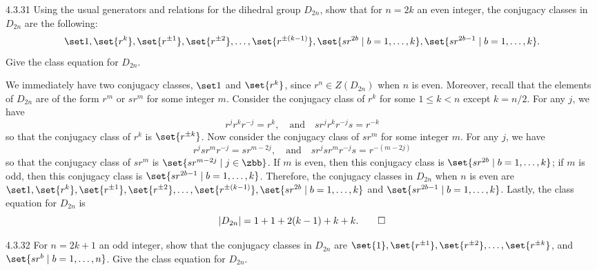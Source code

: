\begin{exercise}{4.3.31}
	Using the usual generators and relations for the dihedral group $D_{2n}$, show that for $n = 2k$ an even integer, the conjugacy classes in $D_{2n}$ are the following:
	\[
		\set 1, \set{r^k}, \set{r^{\pm 1}}, \set{r^{\pm 2}}, \ldots, \set{r^{\pm(k - 1)}}, \set{sr^{2b} \mid b = 1, \ldots, k}, \set{sr^{2b - 1} \mid b = 1, \ldots, k}.
	\]
	Give the class equation for $D_{2n}$.
\end{exercise}

\begin{sol}
	We immediately have two conjugacy classes, $\set 1$ and $\set{r^k}$, since $r^n \in Z(D_{2n})$ when $n$ is even.
	Moreover, recall that the elements of $D_{2n}$ are of the form $r^m$ or $sr^m$ for some integer $m$.
	Consider the conjugacy class of $r^k$ for some $1 \leq k < n$ except $k = n/2$.
	For any $j$, we have
	\[
		r^jr^kr^{-j} = r^k, \quad \text{and} \quad sr^jr^kr^{-j}s = r^{-k}
	\]
	so that the conjugacy class of $r^k$ is $\set{r^{\pm k}}$.
	Now consider the conjugacy class of $sr^m$ for some integer $m$.
	For any $j$, we have
	\[
		r^jsr^mr^{-j} = sr^{m - 2j}, \quad \text{and} \quad sr^jsr^mr^{-j}s = r^{-(m - 2j)}
	\]
	so that the conjugacy class of $sr^m$ is $\set{sr^{m - 2j} \mid j \in \zbb}$.
	If $m$ is even, then this conjugacy class is $\set{sr^{2b} \mid b = 1, \ldots, k}$; if $m$ is odd, then this conjugacy class is $\set{sr^{2b - 1} \mid b = 1, \ldots, k}$.
	Therefore, the conjugacy classes in $D_{2n}$ when $n$ is even are $\set 1, \set{r^k}, \set{r^{\pm 1}}, \set{r^{\pm 2}}, \ldots, \set{r^{\pm(k - 1)}}, \set{sr^{2b} \mid b = 1, \ldots, k}$ and $\set{sr^{2b - 1} \mid b = 1, \ldots, k}$.
	Lastly, the class equation for $D_{2n}$ is
	\[
		|D_{2n}| = 1 + 1 + 2(k - 1) + k + k.\qedhere
	\]
\end{sol}

\begin{exercise}{4.3.32}
	For $n = 2k + 1$ an odd integer, show that the conjugacy classes in $D_{2n}$ are $\set{1}, \set{r^{\pm 1}}, \set{r^{\pm 2}}, \ldots, \set{r^{\pm k}}$, and $\set{sr^b \mid b = 1, \ldots, n}$.
	Give the class equation for $D_{2n}$.
\end{exercise}

